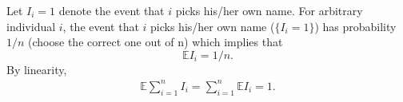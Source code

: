 
\setcounter{theorem}{37}
\begin{exercise} [BH.4.38]
\begin{solution}
    Let $I_i=1$ denote the event that $i$ picks his/her own name.  For arbitrary individual $i$, the event that $i$ picks his/her own name ($\{I_i=1\}$) has probability $1/n$ (choose the correct one out of n) which implies that 
	$$\mathbb{E}I_i =1/n.$$
	By linearity,
	\begin{align*}
		\mathbb{E} \sum_{i=1}^n I_i =	\sum_{i=1}^n \mathbb{E}I_i =1. 
	\end{align*} 
\end{solution}
\end{exercise}

